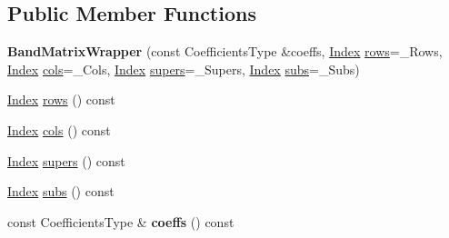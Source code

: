 \subsection*{Public Member Functions}
\begin{DoxyCompactItemize}
\item 
\mbox{\label{class_eigen_1_1internal_1_1_band_matrix_wrapper_a1da1c6d582ee0fd5effd8290d114af62}} 
{\bfseries Band\+Matrix\+Wrapper} (const Coefficients\+Type \&coeffs, \mbox{\hyperlink{struct_eigen_1_1_eigen_base_a554f30542cc2316add4b1ea0a492ff02}{Index}} \mbox{\hyperlink{class_eigen_1_1internal_1_1_band_matrix_wrapper_a8d23b9d25729ac15c06591c810d13160}{rows}}=\+\_\+\+Rows, \mbox{\hyperlink{struct_eigen_1_1_eigen_base_a554f30542cc2316add4b1ea0a492ff02}{Index}} \mbox{\hyperlink{class_eigen_1_1internal_1_1_band_matrix_wrapper_a5c81a2138f0adfb23216de383aaeeeab}{cols}}=\+\_\+\+Cols, \mbox{\hyperlink{struct_eigen_1_1_eigen_base_a554f30542cc2316add4b1ea0a492ff02}{Index}} \mbox{\hyperlink{class_eigen_1_1internal_1_1_band_matrix_wrapper_a5e874cc43bb0b406241e3cc6042335e5}{supers}}=\+\_\+\+Supers, \mbox{\hyperlink{struct_eigen_1_1_eigen_base_a554f30542cc2316add4b1ea0a492ff02}{Index}} \mbox{\hyperlink{class_eigen_1_1internal_1_1_band_matrix_wrapper_a146d5ceb44c93c8e0a48c207ad252a8f}{subs}}=\+\_\+\+Subs)
\item 
\mbox{\hyperlink{struct_eigen_1_1_eigen_base_a554f30542cc2316add4b1ea0a492ff02}{Index}} \mbox{\hyperlink{class_eigen_1_1internal_1_1_band_matrix_wrapper_a8d23b9d25729ac15c06591c810d13160}{rows}} () const
\item 
\mbox{\hyperlink{struct_eigen_1_1_eigen_base_a554f30542cc2316add4b1ea0a492ff02}{Index}} \mbox{\hyperlink{class_eigen_1_1internal_1_1_band_matrix_wrapper_a5c81a2138f0adfb23216de383aaeeeab}{cols}} () const
\item 
\mbox{\hyperlink{struct_eigen_1_1_eigen_base_a554f30542cc2316add4b1ea0a492ff02}{Index}} \mbox{\hyperlink{class_eigen_1_1internal_1_1_band_matrix_wrapper_a5e874cc43bb0b406241e3cc6042335e5}{supers}} () const
\item 
\mbox{\hyperlink{struct_eigen_1_1_eigen_base_a554f30542cc2316add4b1ea0a492ff02}{Index}} \mbox{\hyperlink{class_eigen_1_1internal_1_1_band_matrix_wrapper_a146d5ceb44c93c8e0a48c207ad252a8f}{subs}} () const
\item 
\mbox{\label{class_eigen_1_1internal_1_1_band_matrix_wrapper_a86c85e74d144b8db575f3814e3069651}} 
const Coefficients\+Type \& {\bfseries coeffs} () const
\end{DoxyCompactItemize}
